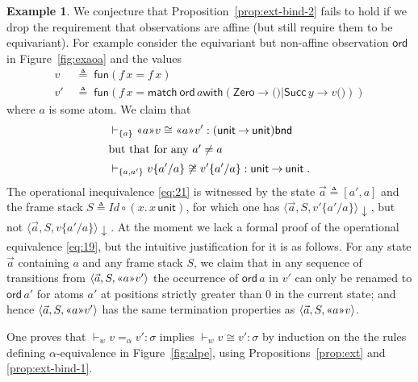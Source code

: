 \documentclass{LMCS}
\theoremstyle{plain}
\theoremstyle{definition}
\newtheorem{example}[thm]{Example}
\newcommand{\aeq}{=_{\alpha}}
\newcommand{\ALT}{\mathrel{\kw{|}}}
\newcommand{\ar}[1][\sigma]{#1}
\newcommand{\atm}[1][a]{#1}
\newcommand{\BINDTY}{\kw{bnd}}
\newcommand{\BINDVAL}[2]{\mathopen{\text{\normalfont\guillemotleft}}#1
  \mathclose{\text{\normalfont\guillemotright}}#2}
\newcommand{\comp}{\circ}
\newcommand{\CON}[1][C]{\kw{#1}}
\newcommand{\config}[3]{\langle#1, #2, #3\rangle}
\newcommand{\defeq}{\triangleq}
\newcommand{\ent}{\vdash}
\newcommand{\EQ}{\mathbin{\kw{=}}}
\newcommand{\es}{\mathit{Id}}
\newcommand{\FUN}{\kw{fun}}
\newcommand{\FUNTY}{\mathbin{\rightarrow}}
\newcommand{\LP}{\mathopen{\kw{(}}}
\newcommand{\kw}[1]{\mathsf{#1}}
\newcommand{\MATCH}{\kw{match}}
\newcommand{\OBS}[1][obs]{\kw{#1}}
\newcommand{\ofty}{:}
\newcommand{\opeq}{\cong}
\newcommand{\rename}[2]{\{#2/#1\}}
\newcommand{\RP}{\mathclose{\kw{)}}}
\newcommand{\s}[1][a]{\vec{#1}}
\newcommand{\stk}[1][S]{#1}
\newcommand{\terminates}[1][]{{\downarrow_{#1}}}
\newcommand{\TO}{\mathbin{\rightarrow}}
\newcommand{\UNIT}{\kw{unit}}
\newcommand{\UNITVAL}{\LP\RP}
\newcommand{\val}[1][v]{#1}
\newcommand{\vid}[1][x]{#1}
\newcommand{\w}[1][w]{#1}
\newcommand{\WITH}{\mathbin{\kw{with}}}
\begin{document}
\begin{example}
  \label{exa:conjecture}
  We conjecture that Proposition~\ref{prop:ext-bind-2} fails to hold
  if we drop the requirement that observations are affine (but still
  require them to be equivariant). For example consider the
  equivariant but non-affine observation $\OBS[ord]$ in
  Figure~\ref{fig:exaoa} and the values
  \begin{align*}
    \val &\;\defeq\; \FUN(\vid[f]\,\vid\EQ\vid[f]\,\vid)\\
    \val' &\;\defeq\; \FUN(\vid[f]\,\vid\EQ \MATCH\ {\OBS[ord]\,\atm}
    \WITH (\CON[Zero]\TO\UNITVAL \ALT
    \CON[Succ]\,\vid[y]\TO\val\UNITVAL))
  \end{align*}
  where $\atm$ is some atom. We claim that
  \begin{align}
    {} &\ent_{\{\atm\}} \BINDVAL{\atm}{\val} \opeq
    \BINDVAL{\atm}{\val'}
    \ofty (\UNIT\FUNTY\UNIT)\BINDTY\label{eq:19}\\
    \intertext{but that for any $\atm'\not=\atm$} {}
    &\ent_{\{\atm,\atm'\}} \val\rename{\atm}{\atm'}\not\opeq
    \val'\rename{\atm}{\atm'}\ofty \UNIT\FUNTY\UNIT\;.\label{eq:21}
  \end{align}
  The operational inequivalence \eqref{eq:21} is witnessed by the
  state $\s \defeq [a',a]$ and the frame stack $\stk\defeq
  \es\comp(\vid.\,\vid\,\UNIT)$, for which one has
  $\config{\s}{\stk}{\val'\rename{\atm}{\atm'}}\terminates$, but not
  $\config{\s}{\stk}{\val\rename{\atm}{\atm'}}\terminates$. At the
  moment we lack a formal proof of the operational equivalence
  \eqref{eq:19}, but the intuitive justification for it is as follows.
  For any state $\s$ containing $\atm$ and any frame stack $\stk$, we
  claim that in any sequence of transitions from
  $\config{\s}{\stk}{\BINDVAL{\atm}{\val'}}$ the occurrence of
  $\OBS[ord]\,\atm$ in $\val'$ can only be renamed to
  $\OBS[ord]\,\atm'$ for atoms $\atm'$ at positions strictly greater
  than $0$ in the current state; and hence
  $\config{\s}{\stk}{\BINDVAL{\atm}{\val'}}$ has the same termination
  properties as $\config{\s}{\stk}{\BINDVAL{\atm}{\val}}$.
\end{example}

  One proves that ${}\ent_{\w} \val\aeq\val'\ofty \ar$ implies
  ${}\ent_{\w} \val \opeq\val'\ofty\ar$ by induction on the the rules
  defining $\alpha$-equivalence in Figure~\ref{fig:alpe}, using
  Propositions~\ref{prop:ext} and \ref{prop:ext-bind-1}.
\end{document}
